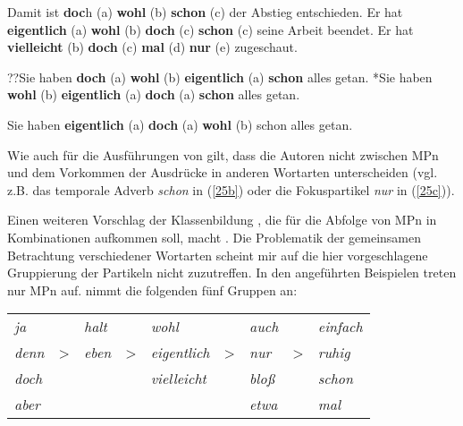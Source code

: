 \begin{exe}
	\ex\label{25} 
		\begin{xlist}	
			\ex\label{25a} Damit ist \textbf{doc}h (a) \textbf{wohl} (b) \textbf{schon} (c) der Abstieg entschieden.
			\ex\label{25b} Er hat \textbf{eigentlich} (a) \textbf{wohl} (b) \textbf{doch} (c) \textbf{schon} (c) seine Arbeit beendet.
			\ex\label{25c} Er hat \textbf{vielleicht} (b) \textbf{doch} (c) \textbf{mal} (d) \textbf{nur} (e) zugeschaut.
		\end{xlist}
	\hfill\hbox{\citet[42]{Helbig1981}}	
\end{exe}

\begin{exe}
	\ex\label{26} 
		\begin{xlist}	
			\ex\label{26a} ??Sie haben \textbf{doch} (a) \textbf{wohl} (b) \textbf{eigentlich} (a) \textbf{schon} alles getan.
			\ex\label{26b} *Sie haben \textbf{wohl} (b) \textbf{eigentlich} (a) \textbf{doch} (a) \textbf{schon} alles getan.
		\end{xlist}
\end{exe}

\begin{exe}
	\ex\label{27} 
	Sie haben \textbf{eigentlich} (a) \textbf{doch} (a) \textbf{wohl} (b) schon alles getan.
	\newline
	\hbox{}\hfill\hbox{\citet[249]{Abraham1995}}
\end{exe}
Wie auch für die Ausführungen von \citet{Engel1968} gilt, dass die Autoren nicht zwischen MPn und dem Vorkommen der Ausdrücke in anderen Wortarten unterscheiden (vgl. z.B. das temporale Adverb \textit{schon} in (\ref{25b}) oder die Fokuspartikel \textit{nur} in (\ref{25c})). 

Einen weiteren Vorschlag der Klassenbildung , die für die Abfolge von MPn in Kombinationen aufkommen soll, macht \citet{Thurmair1991}. Die Problematik der gemeinsamen Betrachtung verschiedener Wortarten scheint mir auf die hier vor\-geschlagene Gruppierung der Partikeln nicht zuzutreffen. In den angeführten Beispielen treten nur MPn auf. \citet[31]{Thurmair1991} nimmt die folgenden fünf Gruppen an:

\begin{exe}
\ex\label{199xy}
\begin{tabular}[t]{lllllllll}
  	\textit{ja} & & \textit{halt} & & \textit{wohl} & & \textit{auch} & & \textit{einfach}\\
  	\textit{denn} & > & \textit{eben} & > & \textit{eigentlich} & > & \textit{nur} & > & \textit{ruhig}\\
  	\textit{doch} & & & & \textit{vielleicht} & & \textit{bloß} & & \textit{schon}\\
  	\textit{aber} & & & & & & \textit{etwa} & & \textit{mal}\\
\end{tabular}
\end{exe}

